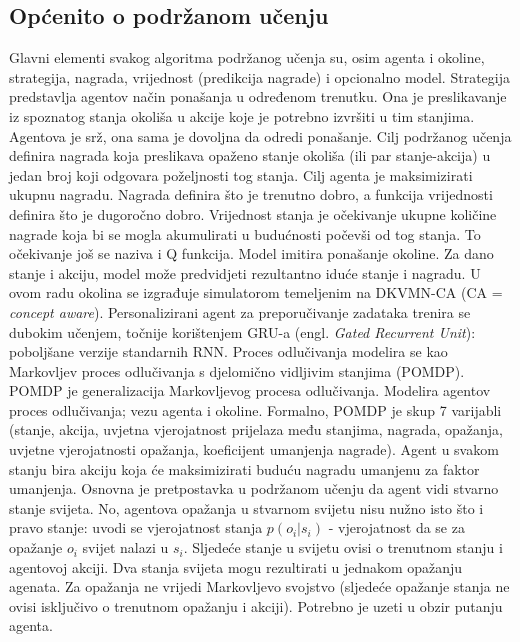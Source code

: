 \documentclass[times, utf8,projekt]{fer}
\begin{document}
\subsection{Općenito o podržanom učenju}
Glavni elementi svakog algoritma podržanog učenja su, osim agenta i okoline, strategija, nagrada, vrijednost (predikcija nagrade) i opcionalno model. Strategija predstavlja agentov način ponašanja u određenom trenutku. Ona je preslikavanje iz spoznatog stanja okoliša u akcije koje je potrebno izvršiti u tim stanjima. Agentova je srž, ona sama je dovoljna da odredi ponašanje. \newline
Cilj podržanog učenja definira nagrada koja preslikava opaženo stanje okoliša (ili par stanje-akcija) u jedan broj koji odgovara poželjnosti tog stanja. Cilj agenta je maksimizirati ukupnu nagradu. Nagrada definira što je trenutno dobro, a funkcija vrijednosti definira što je dugoročno dobro. Vrijednost stanja je očekivanje ukupne količine nagrade koja bi se mogla akumulirati u budućnosti počevši od tog stanja. To očekivanje još se naziva i Q funkcija.\newline
Model imitira ponašanje okoline. Za dano stanje i akciju, model može predvidjeti rezultantno iduće stanje i nagradu.\newline
\newline
U ovom radu okolina se izgrađuje simulatorom temeljenim na DKVMN-CA (CA = \textit{concept aware}). Personalizirani agent za preporučivanje zadataka trenira se dubokim učenjem, točnije korištenjem GRU-a (engl. \textit{Gated Recurrent Unit}): poboljšane verzije standarnih RNN. \newline
\newline
Proces odlučivanja modelira se kao Markovljev proces odlučivanja s djelomično vidljivim stanjima (POMDP).
POMDP je generalizacija Markovljevog procesa odlučivanja. Modelira agentov proces odlučivanja; vezu agenta i okoline.
Formalno, POMDP je skup 7 varijabli (stanje, akcija, uvjetna vjerojatnost prijelaza među stanjima, nagrada, opažanja, uvjetne vjerojatnosti opažanja, koeficijent umanjenja nagrade). Agent u svakom stanju bira akciju koja će maksimizirati buduću nagradu umanjenu za faktor umanjenja.\newline
Osnovna je pretpostavka u podržanom učenju da agent vidi stvarno stanje svijeta. No, agentova opažanja u stvarnom svijetu nisu nužno isto što i pravo stanje: uvodi se vjerojatnost stanja $p(o_i|s_i)$ - vjerojatnost da se za opažanje $o_i$ svijet nalazi u $s_i$. Sljedeće stanje u svijetu ovisi o trenutnom stanju i agentovoj akciji. Dva stanja svijeta mogu rezultirati u jednakom opažanju agenata. Za opažanja ne vrijedi Markovljevo svojstvo (sljedeće opažanje stanja ne ovisi isključivo o trenutnom opažanju i akciji). Potrebno je uzeti u obzir putanju agenta. \newline
\newline
\end{document}
